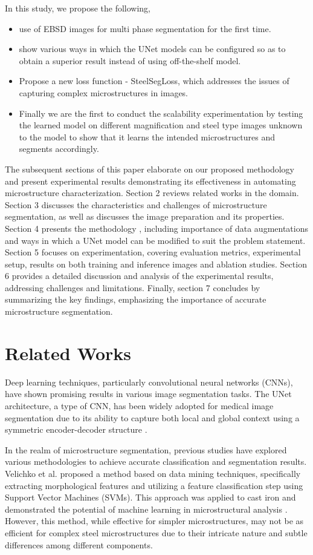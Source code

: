 \documentclass[]{article}
\begin{document}
In this study, we propose the following,
\begin{itemize}
	\item use of EBSD images for multi phase segmentation for the first time.
	\item show various ways in which the UNet models can be configured so as to obtain a superior result instead of using off-the-shelf model.
	\item Propose a new loss function - SteelSegLoss, which addresses the issues of capturing complex microstructures in images. 
	\item Finally we are the first to conduct the scalability experimentation by testing the learned model on different magnification and steel type images unknown to the model to show that it learns the intended microstructures and segments accordingly.
\end{itemize}
 

The subsequent sections of this paper elaborate on our proposed methodology and present experimental results demonstrating its effectiveness in automating microstructure characterization. Section 2 reviews related works in the domain. Section 3 discusses the characteristics and challenges of microstructure segmentation, as well as discusses the image preparation and its properties. Section 4 presents the methodology , including importance of data augmentations and ways in which a UNet model can be modified to suit the problem statement. Section 5 focuses on experimentation, covering evaluation metrics, experimental setup, results on both training and inference images and ablation studies. Section 6 provides a detailed discussion and analysis of the experimental results, addressing challenges and limitations. Finally, section 7 concludes by summarizing the key findings, emphasizing the importance of accurate microstructure segmentation.


\section{Related Works}

Deep learning techniques, particularly convolutional neural networks (CNNs), have shown promising results in various image segmentation tasks. The UNet architecture, a type of CNN, has been widely adopted for medical image segmentation due to its ability to capture both local and global context using a symmetric encoder-decoder structure \cite{cao2021swinunet}.

In the realm of microstructure segmentation, previous studies have explored various methodologies to achieve accurate classification and segmentation results. Velichko et al. proposed a method based on data mining techniques, specifically extracting morphological features and utilizing a feature classification step using Support Vector Machines (SVMs). This approach was applied to cast iron and demonstrated the potential of machine learning in microstructural analysis \cite{sym13071176}. However, this method, while effective for simpler microstructures, may not be as efficient for complex steel microstructures due to their intricate nature and subtle differences among different components.
\end{document}
